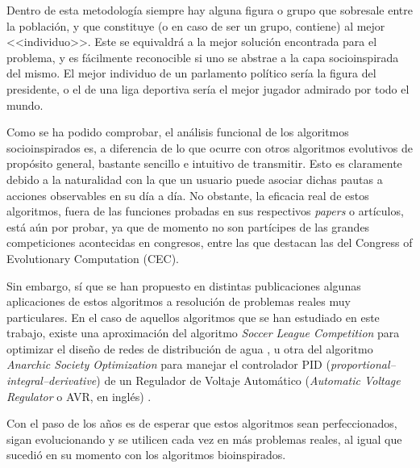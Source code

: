 Dentro de esta metodología siempre hay alguna figura o grupo que sobresale entre la población, y que constituye (o en caso de ser un grupo, contiene) al mejor <<individuo>>. Este se equivaldrá a la mejor solución encontrada para el problema, y es fácilmente reconocible si uno se abstrae a la capa socioinspirada del mismo. El mejor individuo de un parlamento político sería la figura del presidente, o el de una liga deportiva sería el mejor jugador admirado por todo el mundo.

Como se ha podido comprobar, el análisis funcional de los algoritmos socioinspirados es, a diferencia de lo que ocurre con otros algoritmos evolutivos de propósito general, bastante sencillo e intuitivo de transmitir. Esto es claramente debido a la naturalidad con la que un usuario puede asociar dichas pautas a acciones observables en su día a día. No obstante, la eficacia real de estos algoritmos, fuera de las funciones probadas en sus respectivos \textit{papers} o artículos, está aún por probar, ya que de momento no son partícipes de las grandes competiciones acontecidas en congresos, entre las que destacan las del Congress of Evolutionary Computation (CEC).

Sin embargo, sí que se han propuesto en distintas publicaciones algunas aplicaciones de estos algoritmos a resolución de problemas reales muy particulares. En el caso de aquellos algoritmos que se han estudiado en este trabajo, existe una aproximación del algoritmo \textit{Soccer League Competition} para optimizar el diseño de redes de distribución de agua \cite{slc-article}, u otra del algoritmo \textit{Anarchic Society Optimization} para manejar el controlador PID (\textit{proportional–integral–derivative}) de un Regulador de Voltaje Automático (\textit{Automatic Voltage Regulator} o AVR, en inglés) \cite{aso-article}.

Con el paso de los años es de esperar que estos algoritmos sean perfeccionados, sigan evolucionando y se utilicen cada vez en más problemas reales, al igual que sucedió en su momento con los algoritmos bioinspirados.
